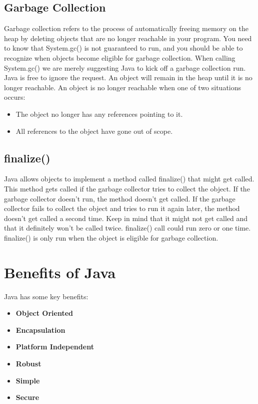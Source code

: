 \documentclass{article}
\begin{document}
\subsection{Garbage Collection}
Garbage collection refers to the process of automatically freeing memory on the heap by deleting objects that are no longer reachable in your program.
You need to know that System.gc() is not guaranteed to run, and you should be able to recognize when objects become eligible for garbage collection.
When calling System.gc() we are merely suggesting Java to kick off a garbage collection run. Java is free to ignore the request.
An object will remain in the heap until it is no longer reachable. An object is no longer reachable when one of two situations occurs:
\begin{itemize}
	\item The object no longer has any references pointing to it.
	\item All references to the object have gone out of scope.
\end{itemize}

\subsection{finalize()}
Java allows objects to implement a method called finalize() that might get called. This method gets called if the garbage collector tries to collect the object. If the garbage collector doesn't run, the method doesn't get called. If the garbage collector fails to collect the object and tries to run it again later, the method doesn't get called a second time.
Keep in mind that it might not get called and that it definitely won't be called twice.
finalize() call could run zero or one time. finalize() is only run when the object is eligible for garbage collection.

\section{Benefits of Java}
Java has some key benefits:
\begin{itemize}
	\item \textbf{Object Oriented} 
	\item \textbf{Encapsulation} 
	\item \textbf{Platform Independent} 
	\item \textbf{Robust} 
	\item \textbf{Simple} 
	\item \textbf{Secure} 
\end{itemize}
\end{document}
